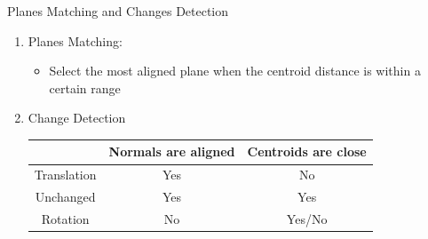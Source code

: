 \documentclass{beamer}
\begin{document}
\begin{frame}{Planes Matching and Changes Detection}
\begin{enumerate}
    \item Planes Matching:
    \begin{itemize}
        \item Select the most aligned plane when the centroid distance is within a certain range
    \end{itemize}
    \item Change Detection
    \begin{table}[]
        \centering
        \begin{tabular}{|c||c|c|}\hline 
             & Normals are aligned & Centroids are close\\ \hline \hline
             Translation& Yes &  No \\ \hline 
             Unchanged & Yes & Yes \\ \hline
             Rotation & No & Yes/No\\ \hline 
        \end{tabular}
    \end{table}
\end{enumerate}
    
\end{frame}
\end{document}

